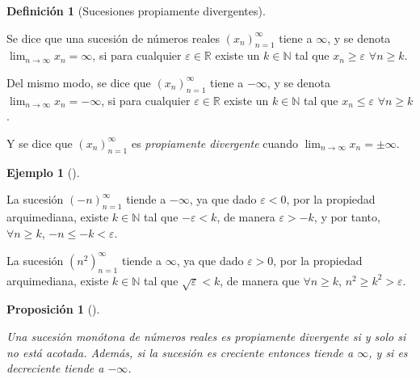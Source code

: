 \documentclass[
  a4paper,
]{scrreport}
\theoremstyle{definition}
\newtheorem{example}{Ejemplo}[chapter]
\theoremstyle{plain}
\theoremstyle{definition}
\newtheorem{definition}{Definición}[chapter]
\theoremstyle{plain}
\theoremstyle{plain}
\newtheorem{proposition}{Proposición}[chapter]
\theoremstyle{remark}
\begin{document}
\leavevmode{}%
\begin{definition}[Sucesiones propiamente
divergentes]\label{def-sucesiones-propiamente-divergentes}

Se dice que una sucesión de números reales \((x_n)_{n=1}^\infty\) tiene
a \(\infty\), y se denota \(\lim_{n\to\infty}x_n=\infty\), si para
cualquier \(\varepsilon\in\mathbb{R}\) existe un \(k\in\mathbb{N}\) tal
que \(x_n\geq\varepsilon\) \(\forall n\geq k\).

Del mismo modo, se dice que \((x_n)_{n=1}^\infty\) tiene a \(-\infty\),
y se denota \(\lim_{n\to\infty}x_n=-\infty\), si para cualquier
\(\varepsilon\in\mathbb{R}\) existe un \(k\in\mathbb{N}\) tal que
\(x_n\leq \varepsilon\) \(\forall n\geq k\).

Y se dice que \((x_n)_{n=1}^\infty\) es \emph{propiamente divergente}
cuando \(\lim_{n\to\infty}x_n=\pm\infty\).

\end{definition}

\leavevmode{}%
\begin{example}[]\label{exm-sucesiones-propiamente-divergentes}

La sucesión \((-n)_{n=1}^\infty\) tiende a \(-\infty\), ya que dado
\(\varepsilon<0\), por la propiedad arquimediana, existe
\(k\in\mathbb{N}\) tal que \(-\varepsilon<k\), de manera
\(\varepsilon>-k\), y por tanto, \(\forall n\geq k\),
\(-n\leq -k < \varepsilon\).

La sucesión \((n^2)_{n=1}^\infty\) tiende a \(\infty\), ya que dado
\(\varepsilon>0\), por la propiedad arquimediana, existe
\(k\in\mathbb{N}\) tal que \(\sqrt{\varepsilon}<k\), de manera que
\(\forall n\geq k\), \(n^2\geq k^2>\varepsilon\).

\end{example}

\leavevmode{}%
\begin{proposition}[]\label{prp-sucesiones-propiamentes-divergentes-no-acotadas}

Una sucesión monótona de números reales es propiamente divergente si y
solo si no está acotada. Además, si la sucesión es creciente entonces
tiende a \(\infty\), y si es decreciente tiende a \(-\infty\).

\end{proposition}
\end{document}
